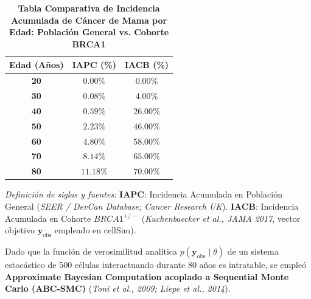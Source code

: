 \documentclass[10pt,a4paper]{article}
\begin{document}
\begin{table}[h!]
\centering
\small
\caption{\textbf{Tabla Comparativa de Incidencia Acumulada de Cáncer de Mama por Edad: Población General vs. Cohorte BRCA1}}
\begin{tabular}{ccc}
\toprule
\textbf{Edad (Años)} & \textbf{IAPC (\%)} & \textbf{IACB (\%)} \\
\midrule
\textbf{20} & $0.00\%$ & $0.00\%$ \\
\textbf{30} & $0.08\%$ & $4.00\%$ \\
\textbf{40} & $0.59\%$ & $26.00\%$ \\
\textbf{50} & $2.23\%$ & $46.00\%$ \\
\textbf{60} & $4.80\%$ & $58.00\%$ \\
\textbf{70} & $8.14\%$ & $65.00\%$ \\
\textbf{80} & $11.18\%$ & $70.00\%$ \\
\bottomrule
\end{tabular}
\label{tab:incidencia_comparada}
\vspace{0.4em}
\begin{flushleft}
\footnotesize \textit{Definición de siglas y fuentes:} \textbf{IAPC}: Incidencia Acumulada en Población General (\textit{SEER / DevCan Database; Cancer Research UK}). \textbf{IACB}: Incidencia Acumulada en Cohorte $BRCA1^{+/-}$ (\textit{Kuchenbaecker et al., JAMA 2017}, vector objetivo $\mathbf{y}_{\text{obs}}$ empleado en cellSim).
\end{flushleft}
\end{table}

Dado que la función de verosimilitud analítica $p(\mathbf{y}_{\text{obs}} \mid \theta)$ de un sistema estocástico de 500 células interactuando durante 80 años es intratable, se empleó \textbf{Approximate Bayesian Computation acoplado a Sequential Monte Carlo (ABC-SMC)} (\textit{Toni et al., 2009; Liepe et al., 2014}).
\end{document}
